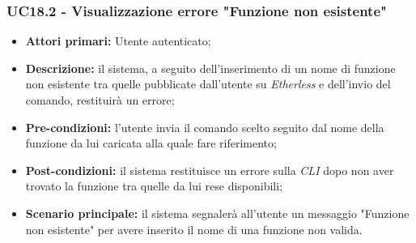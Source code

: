 \subsubsection{UC18.2 - Visualizzazione errore "Funzione non esistente"}
\begin{itemize}
	\item \textbf{Attori primari:} Utente autenticato;
	\item \textbf{Descrizione:} il sistema, a seguito dell'inserimento di un nome di funzione non esistente tra quelle pubblicate dall'utente su \textit{Etherless} e dell'invio del comando, restituirà un errore; 
	\item \textbf{Pre-condizioni:} l'utente invia il comando scelto seguito dal nome della funzione da lui caricata alla quale fare riferimento;
	\item \textbf{Post-condizioni:} il sistema restituisce un errore sulla \textit{CLI\glo} dopo non aver trovato la funzione tra quelle da lui rese disponibili;
	\item \textbf{Scenario principale:} il sistema segnalerà all'utente un messaggio "Funzione non esistente" per avere inserito il nome di una funzione non valida.
\end{itemize}
